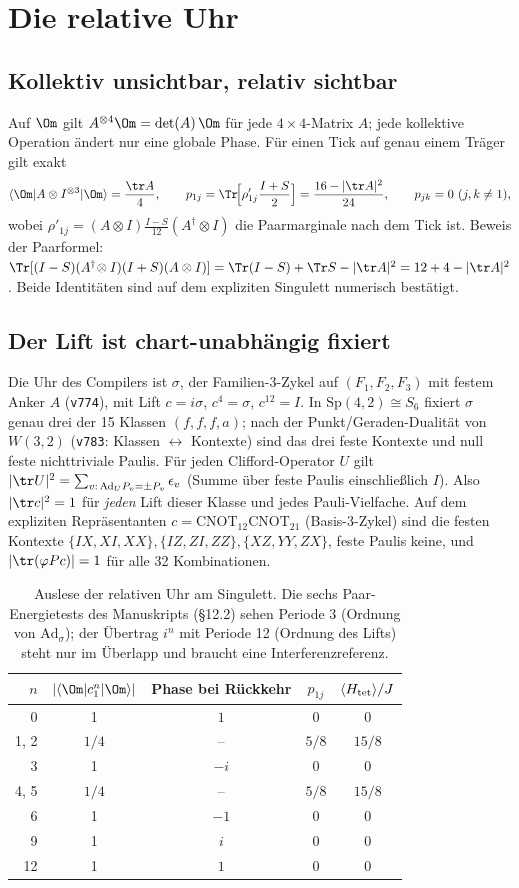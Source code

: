 \section{Die relative Uhr}
\subsection{Kollektiv unsichtbar, relativ sichtbar}
Auf $\Om$ gilt $A^{\otimes4}\Om=\det(A)\,\Om$ für jede $4\times4$-Matrix $A$; jede kollektive Operation ändert nur eine globale Phase. Für einen Tick auf genau einem Träger gilt exakt
\[
\langle\Om|A\otimes I^{\otimes3}|\Om\rangle=\frac{\tr A}{4},\qquad
p_{1j}=\Tr\!\Big[\rho'_{1j}\frac{I+S}{2}\Big]=\frac{16-|\tr A|^2}{24},\qquad p_{jk}=0\ (j,k\ne1),
\]
wobei $\rho'_{1j}=(A\otimes I)\frac{I-S}{12}(A^\dagger\otimes I)$ die Paarmarginale nach dem Tick ist. Beweis der Paarformel: $\Tr[(I-S)(A^\dagger\!\otimes I)(I+S)(A\otimes I)]=\Tr(I-S)+\Tr S-|\tr A|^2=12+4-|\tr A|^2$. Beide Identitäten sind auf dem expliziten Singulett numerisch bestätigt.

\subsection{Der Lift ist chart-unabhängig fixiert}
Die Uhr des Compilers ist $\sigma$, der Familien-3-Zykel auf $(F_1,F_2,F_3)$ mit festem Anker $A$ (\texttt{v774}), mit Lift $c=i\sigma$, $c^4=\sigma$, $c^{12}=I$. In $\mathrm{Sp}(4,2)\cong S_6$ fixiert $\sigma$ genau drei der 15 Klassen $(f,f,f,a)$; nach der Punkt/Geraden-Dualität von $W(3,2)$ (\texttt{v783}: Klassen $\leftrightarrow$ Kontexte) sind das drei feste Kontexte und null feste nichttriviale Paulis. Für jeden Clifford-Operator $U$ gilt $|\tr U|^2=\sum_{v:\,\mathrm{Ad}_U P_v=\pm P_v}\epsilon_v$ (Summe über feste Paulis einschließlich $I$). Also $|\tr c|^2=1$ für \emph{jeden} Lift dieser Klasse und jedes Pauli-Vielfache. Auf dem expliziten Repräsentanten $c=\mathrm{CNOT}_{12}\mathrm{CNOT}_{21}$ (Basis-3-Zykel) sind die festen Kontexte $\{IX,XI,XX\},\{IZ,ZI,ZZ\},\{XZ,YY,ZX\}$, feste Paulis keine, und $|\tr(\varphi Pc)|=1$ für alle 32 Kombinationen.

\begin{table}[h]\centering
\begin{tabular}{@{}rcccc@{}}\toprule
$n$ & $|\langle\Om|c_1^n|\Om\rangle|$ & Phase bei Rückkehr & $p_{1j}$ & $\langle H_{\rm tet}\rangle/J$\\\midrule
0 & 1 & $1$ & 0 & 0\\
1, 2 & $1/4$ & -- & $5/8$ & $15/8$\\
3 & 1 & $-i$ & 0 & 0\\
4, 5 & $1/4$ & -- & $5/8$ & $15/8$\\
6 & 1 & $-1$ & 0 & 0\\
9 & 1 & $i$ & 0 & 0\\
12 & 1 & $1$ & 0 & 0\\\bottomrule
\end{tabular}
\caption{Auslese der relativen Uhr am Singulett. Die sechs Paar-Energietests des Manuskripts (§12.2) sehen Periode 3 (Ordnung von $\mathrm{Ad}_\sigma$); der Übertrag $i^n$ mit Periode 12 (Ordnung des Lifts) steht nur im Überlapp und braucht eine Interferenzreferenz.}
\end{table}

